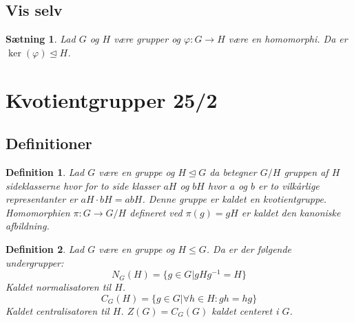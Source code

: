 \documentclass{article}
\newcommand{\inv}{^{-1}}
\newcommand{\too}{\rightarrow}
\newtheorem{setn}{Sætning}
\newtheorem{defi}{Definition}
\begin{document}
		\subsection*{Vis selv}
		\begin{setn}
			Lad $G$ og $H$ være grupper og $\varphi: G \too H$ være en homomorphi.
			Da er $\ker(\varphi) \unlhd H$.
		\end{setn}
	\newpage
	\section*{Kvotientgrupper 25/2}
		\subsection*{Definitioner}
		\begin{defi}
			Lad $G$ være en gruppe og $H \unlhd G$ da betegner $G/H$ gruppen
			af $H$ sideklasserne hvor for to side klasser $aH$ og $bH$ hvor $a$ og $b$
			er to vilkårlige representanter er $aH\cdot bH = abH$. Denne gruppe er kaldet
			en kvotientgruppe.
			Homomorphien $\pi: G \too G/H$ defineret ved $\pi(g) = gH$ er kaldet
			den kanoniske afbildning.
		\end{defi}
		\begin{defi}
			Lad $G$ være en gruppe og $H \le G$. Da er der følgende undergrupper:
			$$N_G(H) = \{g \in G| gHg\inv = H\}$$
			Kaldet normalisatoren til $H$.
			$$C_G(H) = \{g \in G| \forall h \in H: gh = hg\}$$
			Kaldet centralisatoren til $H$.
			$Z(G) = C_G(G)$ kaldet centeret i $G$.
		\end{defi}
\end{document}
